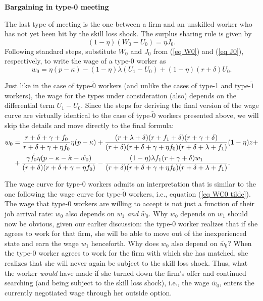 \documentclass[12pt]{article} %
\theoremstyle{definition}
\begin{document}
\bigskip 
    
\noindent \textbf{Bargaining in type-0 meeting}

\medskip 

\noindent The last type of meeting is the one between a firm and an unskilled worker who has not yet been hit by the skill loss shock. The surplus sharing rule is given by 
\begin{equation}
       (1-\eta)(W_0-U_0) = \eta J_0 .  \nonumber 
\end{equation}Following standard steps, substitute ${W_0}$ and ${J_0}$ from (\ref{eq W0}) and (\ref{eq J0}), respectively, to write the wage of a type-0 worker as
\begin{equation}
    w_0 = \eta(p-\kappa) - (1-\eta)\lambda(U_1 - U_0) + (1-\eta)(r+\delta) U_0. \nonumber 
    \end{equation}
    
Just like in the case of type-$\tilde{0}$ workers (and unlike the cases of type-1 and type-$\tilde{1}$ workers), the wage for the types under consideration (also) depends on the differential term ${U_1}-{U_0}$. Since the steps for deriving the final version of the wage curve are virtually identical to the case of type-$\tilde{0}$ workers presented above, we will skip the details and move directly to the final formula:  
\begin{equation}\label{eq WC0}
 \begin{split}
         w_0 & = \frac{r+\delta+\gamma +f_0}{r+\delta+\gamma+\eta f_0}\eta (p-\kappa) + \frac{(r+\lambda+\delta)(r+f_1+\delta)(r+\gamma+\delta)}{(r+\delta)(r+\delta+\gamma + \eta f_0)(r+\delta+\lambda+f_1)} (1-\eta) z + \\  
 & + \frac{\gamma \Tilde{f_0}\eta(p-\kappa-\Tilde{\kappa}-\Tilde{w_0})}{(r+\delta)(r+\delta+\gamma + \eta f_0)} - \frac{(1-\eta)\lambda f_1 (r+\gamma+\delta)w_1}{(r+\delta)(r+\delta+\gamma + \eta f_0)(r+\delta+\lambda+f_1)}. 
    \end{split}
\end{equation}

The wage curve for type-0 workers admits an interpretation that is similar to the one following the wage curve for type-$\tilde{0}$ workers, i.e., equation (\ref{eq WC0 tilde}). The wage that type-0 workers are willing to accept is not just a function of their job arrival rate: ${w_0}$ also depends on ${w_1}$ \textit{and} $\tilde{w_0}$. Why ${w_0}$ depends on ${w_1}$ should now be obvious, given our earlier discussion: the type-0 worker realizes that if she agrees to work for that firm, she will be able to move out of the inexperienced state and earn the wage ${w_1}$ henceforth. Why does ${w_0}$ also depend on $\tilde{w_0}$? When the type-0 worker agrees to work for the firm with which she has matched, she realizes that she will never again be subject to the skill loss shock. Thus, what the worker \textit{would} have made if she turned down the firm's offer and continued searching (and being subject to the skill loss shock), i.e., the wage $\tilde{w_0}$, enters the currently negotiated wage through her outside option.   
\end{document}
